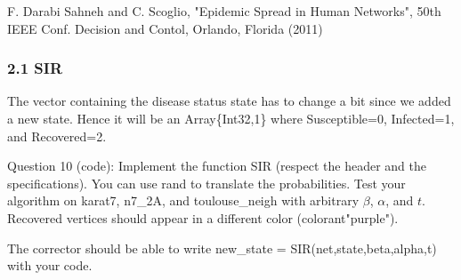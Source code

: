\documentclass[11pt]{article}
\begin{document}
F. Darabi Sahneh and C. Scoglio, "Epidemic Spread in Human Networks",
50th IEEE Conf. Decision and Contol, Orlando, Florida (2011)

    \subsubsection{2.1 SIR}\label{sir}

The vector containing the disease status state has to change a bit since
we added a new state. Hence it will be an Array\{Int32,1\} where
Susceptible=0, Infected=1, and Recovered=2.

    Question 10 (code): Implement the function SIR (respect the header and
the specifications). You can use rand to translate the probabilities.
Test your algorithm on karat7, n7\_2A, and toulouse\_neigh with
arbitrary \(\beta\), \(\alpha\), and \(t\). Recovered vertices should
appear in a different color (colorant"purple").

{The corrector should be able to write new\_state =
SIR(net,state,beta,alpha,t) with your code.}
\end{document}
